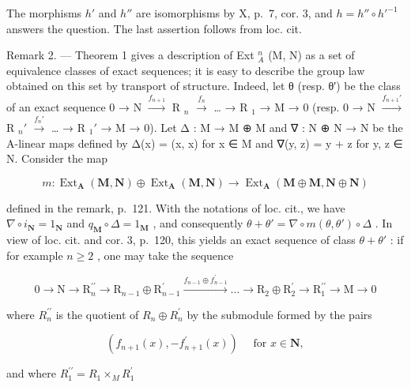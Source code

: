 The morphisms \(h'\) and \(h''\) are isomorphisms by X, p.~7, cor. 3, and \(h = h'' \circ h'^{-1}\) answers the question. The last assertion follows from loc. cit.

Remark 2. --- Theorem 1 gives a description of Ext \(_{A}^{n}\) (M, N) as a set of equivalence classes of exact sequences; it is easy to describe the group law obtained on this set by transport of structure. Indeed, let θ (resp. θ′) be the class of an exact sequence 0 → N \(\xrightarrow{f_{n+1}}\) R \(_{n}\) \(\xrightarrow{f_n}\) \ldots{} → R \(_{1}\) → M → 0 (resp. 0 → N \(\xrightarrow{f_{n+1}'}\) R \(_{n}'\) \(\xrightarrow{f_n'}\) \ldots{} → R \(_{1}'\) → M → 0). Let Δ : M → M ⊕ M and ∇ : N ⊕ N → N be the A-linear maps defined by Δ(x) = (x, x) for x ∈ M and ∇(y, z) = y + z for y, z ∈ N. Consider the map

\[
m: \operatorname{Ext} _ {\mathbf {A}} (\mathbf {M}, \mathbf {N}) \oplus \operatorname{Ext} _ {\mathbf {A}} (\mathbf {M}, \mathbf {N}) \rightarrow \operatorname{Ext} _ {\mathbf {A}} (\mathbf {M} \oplus \mathbf {M}, \mathbf {N} \oplus \mathbf {N})
\]

defined in the remark, p.~121. With the notations of loc. cit., we have \(\nabla \circ i_{\mathbf{N}} = 1_{\mathbf{N}}\) and \(q_{\mathbf{M}} \circ \Delta = 1_{\mathbf{M}}\) , and consequently \(\theta + \theta' = \nabla \circ m(\theta, \theta') \circ \Delta\) . In view of loc. cit. and cor. 3, p.~120, this yields an exact sequence of class \(\theta + \theta'\) : if for example \(n \geqslant 2\) , one may take the sequence

\[
0 \rightarrow \mathrm{N} \rightarrow \mathrm{R} _ {n} ^ {\prime \prime} \rightarrow \mathrm{R} _ {n - 1} \oplus \mathrm{R} _ {n - 1} ^ {\prime} \xrightarrow {f _ {n - 1} \oplus f _ {n - 1} ^ {\prime}} \dots \rightarrow \mathrm{R} _ {2} \oplus \mathrm{R} _ {2} ^ {\prime} \rightarrow \mathrm{R} _ {1} ^ {\prime \prime} \rightarrow \mathrm{M} \rightarrow 0
\]

where \(R_{n}^{\prime\prime}\) is the quotient of \(R_{n} \oplus R_{n}^{\prime}\) by the submodule formed by the pairs

\[
\left(f _ {n + 1} (x), - f _ {n + 1} ^ {\prime} (x)\right) \quad \text { for } x \in \mathbf {N},
\]

and where \(R_{1}^{\prime\prime}=R_{1}\times_{M}R_{1}^{\prime}\)

